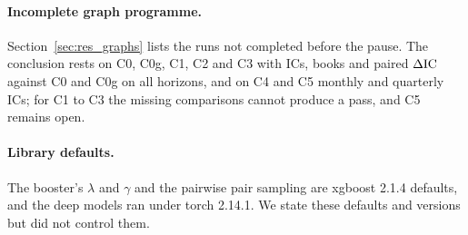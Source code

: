 \paragraph{Incomplete graph programme.}
Section~\ref{sec:res_graphs} lists the runs not completed before the pause. The conclusion rests on C0, C0g, C1, C2 and C3 with ICs, books and paired $\Delta\mathrm{IC}$ against C0 and C0g on all horizons, and on C4 and C5 monthly and quarterly ICs; for C1 to C3 the missing comparisons cannot produce a pass, and C5 remains open.

\paragraph{Library defaults.}
The booster's $\lambda$ and $\gamma$ and the pairwise pair sampling are xgboost 2.1.4 defaults, and the deep models ran under torch 2.14.1. We state these defaults and versions but did not control them.
